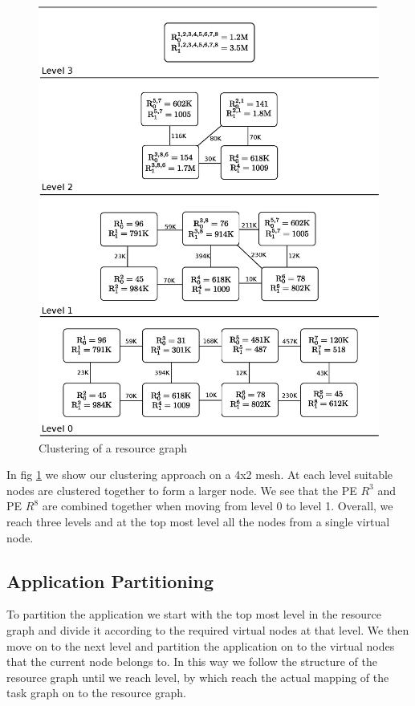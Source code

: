\begin{figure}[ht]
  \includegraphics[scale=0.43]{./figures/resource}
  \caption{Clustering of a resource graph}
  \label{fig:res}
\end{figure}

In fig \ref{fig:res} we show our clustering approach on a 4x2 mesh. At
each level suitable nodes are clustered together to form a larger node.
We see that the PE $ R^3 $ and PE $ R^8 $ are combined together
when moving from level 0 to level 1. Overall, we reach three levels
and at the top most level all the nodes from a single virtual node.

\subsection{Application Partitioning}
\label{sec:appl-part}

To partition the application we start with the top most level in the
resource graph and divide it according to the required virtual nodes
at that level. We then move on to the next level and partition the
application on to the virtual nodes that the current node belongs to.
In this way we follow the structure of the resource graph until we
reach level, by which reach the actual mapping of the task graph on to
the resource graph.

